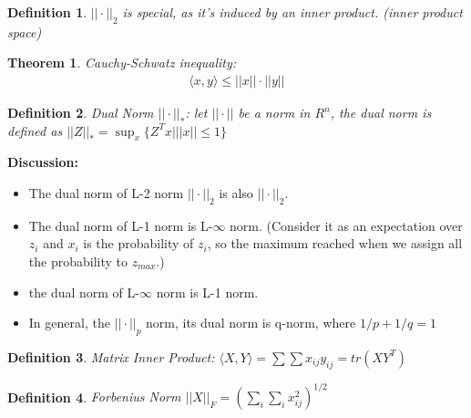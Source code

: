 \documentclass[12pt]{article}
\newtheorem{theorem}{Theorem}
\newtheorem{definition}{Definition}
\begin{document}
\begin{definition}
	$||\cdot||_2$ is special, as it's induced by an inner product. (inner product space)
\end{definition}
\begin{theorem}
	Cauchy-Schwatz inequality: 
	\begin{eqnarray}
		\langle x,y\rangle \le ||x||\cdot ||y||
	\end{eqnarray}
\end{theorem}
\begin{definition}
	Dual Norm $||\cdot||_*$: let $||\cdot||$ be a norm in $R^n$, the dual norm is defined as $||Z||_*=\sup_x\{Z^Tx| ||x||\le 1\}$
\end{definition}
{\bf Discussion:} 
\begin{itemize}
	\item The dual norm of L-2 norm $||\cdot||_2$ is also $||\cdot||_2$. 
	\item The dual norm of L-1 norm is L-$\infty$ norm. (Consider it as an expectation over $z_i$ and $x_i$ is the probability of $z_i$, so the maximum reached when we assign all the probability to $z_{max}$.)
	\item the dual norm of L-$\infty$ norm is L-1 norm.
	\item In general, the $||\cdot||_p$ norm, its dual norm is q-norm, where $1/p + 1/q = 1$
\end{itemize}

\begin{definition}
	Matrix Inner Product: $\langle X,Y\rangle = \sum\sum x_{ij}y_{ij}=tr(XY^T)$
\end{definition}
\begin{definition}
	Forbenius Norm $||X||_F = (\sum_i\sum_i x_{ij}^2)^{1/2}$
\end{definition}
\end{document}
